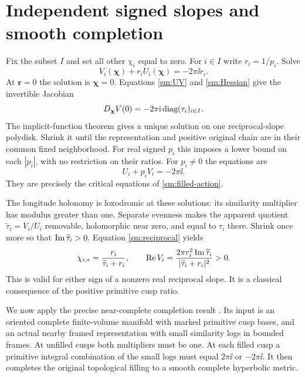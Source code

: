 \section{Independent signed slopes and smooth completion}
\label{sm:filling-proof}

Fix the subset $I$ and set all other $\chi_i$ equal to zero.
For $i\in I$ write $r_i=1/p_i$. Solve
\begin{equation}\label{sm:reciprocal}
                  V_i(\boldsymbol\chi)+r_iU_i(\boldsymbol\chi)
                                  =-2\pi\ii r_i.
\end{equation}
At $\mathbf r=0$ the solution is $\boldsymbol\chi=0$.
Equations \eqref{sm:UV} and \eqref{sm:Hessian} give the invertible
Jacobian
\begin{equation}\label{sm:Jacobian}
                       D_{\boldsymbol\chi}V(0)
                              =-2\pi\mathrm i\operatorname{diag}(\tau_i)_{i\in I}.
\end{equation}
The implicit-function theorem gives a unique solution on one
reciprocal-slope polydisk. Shrink it until the representation and
positive original chain are in their common fixed neighborhood.
For real signed $p_i$ this imposes a lower bound on each $|p_i|$,
with no restriction on their ratios. For $p_i\ne0$ the equations are
\begin{equation}\label{sm:primitive-equations}
                           U_i+p_iV_i=-2\pi\ii .
\end{equation}
They are precisely the critical equations of
\eqref{sm:filled-action}.

The longitude holonomy is loxodromic at these solutions: its
similarity multiplier has modulus greater than one.
Separate evenness makes the apparent quotient
$\widetilde\tau_i=V_i/U_i$ removable, holomorphic near zero, and
equal to $\tau_i$ there. Shrink once more so that
$\operatorname{Im}\widetilde\tau_i>0$. Equation \eqref{sm:reciprocal} yields
\begin{equation}\label{sm:positive-length}
 \chi_{i,*}=\frac{r_i}{\widetilde\tau_i+r_i},\qquad
 \operatorname{Re} V_i=\frac{2\pi r_i^2\operatorname{Im}\widetilde\tau_i}
                         {|\widetilde\tau_i+r_i|^2}>0 .
\end{equation}
This is valid for either sign of a nonzero real reciprocal slope.
It is a classical consequence of the positive primitive cusp ratio.

We now apply the precise near-complete completion result
\cite[Proposition~6.1]{Marked}. Its input is an oriented complete
finite-volume manifold with marked primitive cusp bases, and an
actual nearby framed representation with small similarity logs in
bounded frames. At unfilled cusps both multipliers must be one.
At each filled cusp a primitive integral combination of the small
logs must equal $2\pi\ii$ or $-2\pi\ii$. It then completes the
original topological filling to a smooth complete hyperbolic metric.

